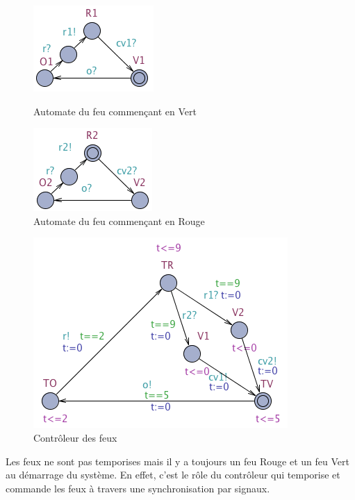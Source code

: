 \documentclass[11pt]{article}
\begin{document}
\begin{figure}[h]
    \begin{minipage}[c]{.46\linewidth}
		\centering
		\includegraphics[scale=0.5]{ressources/part2/Q8-1.png}
		\caption{Automate du feu commençant en Vert}
    \end{minipage}
    \hfill%
    \begin{minipage}[c]{.46\linewidth}
		\centering
		\includegraphics[scale=0.5]{ressources/part2/Q8-2.png}
		\caption{Automate du feu commençant en Rouge}
    \end{minipage}
\end{figure}

\begin{figure}[H]
	\centering
	\includegraphics[scale=0.5]{ressources/part2/Q8-3.png}
	\caption{Contrôleur des feux}
\end{figure}

Les feux ne sont pas temporises mais il y a toujours un feu Rouge et un feu Vert au démarrage du système. En effet, c'est le rôle du contrôleur qui temporise et commande les feux à travers une synchronisation par signaux. 
\end{document}
